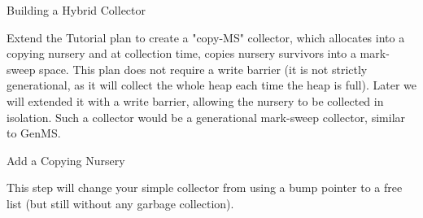 \begin{chapter}{Building a Hybrid Collector}
\label{cha:buildingahybridcollector}

Extend the Tutorial plan to create a "copy-MS" collector, which allocates into a copying nursery and at collection time, copies nursery survivors into a mark-sweep space. This plan does not require a write barrier (it is not strictly generational, as it will collect the whole heap each time the heap is full). Later we will extended it with a write barrier, allowing the nursery to be collected in isolation. Such a collector would be a generational mark-sweep collector, similar to GenMS.

\begin{section}{Add a Copying Nursery}

This step will change your simple collector from using a bump pointer to a free list (but still without any garbage collection).


\end{section}
\end{chapter}
